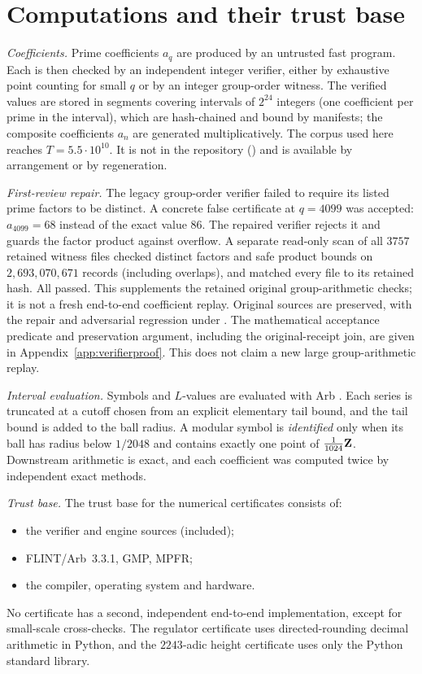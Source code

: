 \section{Computations and their trust base}\label{app:methods}

\emph{Coefficients.} Prime coefficients $a_q$ are produced by an untrusted fast program. Each is then checked by an independent integer verifier, either by exhaustive point counting for small $q$ or by an integer group-order witness. The verified values are stored in segments covering intervals of $2^{24}$ integers (one coefficient per prime in the interval), which are hash-chained and bound by manifests; the composite coefficients $a_n$ are generated multiplicatively. The corpus used here reaches $T=5.5\cdot10^{10}$. It is not in the repository () and is available by arrangement or by regeneration.

\emph{First-review repair.} The legacy group-order verifier failed to require its listed prime factors to be distinct. A concrete false certificate at $q=4099$ was accepted: $a_{4099}=68$ instead of the exact value $86$. The repaired verifier rejects it and guards the factor product against overflow. A separate read-only scan of all $3757$ retained witness files checked distinct factors and safe product bounds on $2{,}693{,}070{,}671$ records (including overlaps), and matched every file to its retained hash. All passed. This supplements the retained original group-arithmetic checks; it is not a fresh end-to-end coefficient replay. Original sources are preserved, with the repair and adversarial regression under . The mathematical acceptance predicate and preservation argument, including the original-receipt join, are given in Appendix~\ref{app:verifierproof}. This does not claim a new large group-arithmetic replay.

\emph{Interval evaluation.} Symbols and $L$-values are evaluated with Arb \cite{arb}. Each series is truncated at a cutoff chosen from an explicit elementary tail bound, and the tail bound is added to the ball radius. A modular symbol is \emph{identified} only when its ball has radius below $1/2048$ and contains exactly one point of $\frac1{1024}\mathbf{Z}$. Downstream arithmetic is exact, and each coefficient was computed twice by independent exact methods.

\emph{Trust base.} The trust base for the numerical certificates consists of:
\begin{itemize}[leftmargin=*]
\item the verifier and engine sources (included);
\item FLINT/Arb~3.3.1, GMP, MPFR;
\item the compiler, operating system and hardware.
\end{itemize}
No certificate has a second, independent end-to-end implementation, except for small-scale cross-checks. The regulator certificate uses directed-rounding decimal arithmetic in Python, and the $2243$-adic height certificate uses only the Python standard library.

